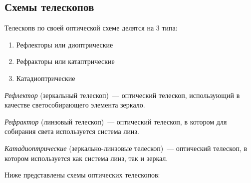 \subsection{Схемы телескопов}
Телескопв по своей оптической схеме делятся на 3 типа:
\begin{enumerate}
\item Рефлекторы или диоптрические
\item Рефракторы или катаптрические
\item Катадиоптрические
\end{enumerate}

\textit{Рефлектор} (зеркальный телескоп)~---  оптический телескоп, использующий в качестве светособирающего элемента зеркало.

\textit{Рефрактор} (линзовый телескоп)~---  оптический телескоп, в котором для собирания света используется система линз.

\textit{Катадиоптрические} (зеркально-линзовые телескоп)~--- оптический телескоп, в котором используется как система линз, так и зеркал.

Ниже представлены схемы оптических телескопов: